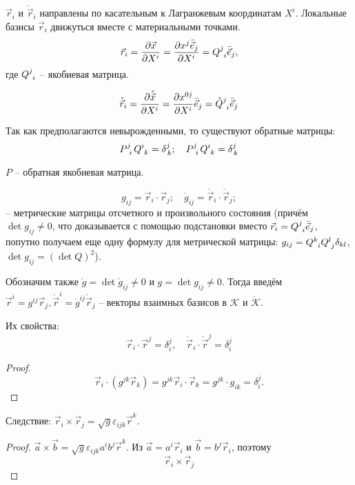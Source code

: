 $\vec{r}_i$ и $\mathring{\vec{r}}_i$ направлены по касательным к Лагранжевым координатам $X^i$. 
Локальные базисы $\vec{r}_i$ движуться вместе с материальными точками. 
\[
  \vec{r}_i
  = \dfrac{\partial \vec{x}}{\partial X^i}
  = \dfrac{\partial x^j \bar{\vec{e}}_j}{\partial X^i}  
  = \tensor{Q}{^j_i} \bar{\vec{e}}_j,
\]
где $\tensor{Q}{^j_i}$ -- якобиевая матрица.

\[
  \mathring{\vec{r}}_i = \dfrac{\partial \mathring{\vec{x}}}{\partial X^i}
  = \dfrac{\partial x^{0j}}{\partial X^i} \bar{\vec{e}}_j
  = \tensor{\mathring{Q}}{^j_i} \bar{\vec{e}}_j
\]

Так как предполагаются невырожденными, то существуют обратные матрицы:
\[
  \tensor{P}{^j_i} \tensor{Q}{^i_k} = \delta^j_{\, k}; \quad
  \tensor{P}{^j_i} \tensor{Q}{^i_k} = \delta^j_{\, k} %
\]

$P$ -- обратная якобиевая матрица.

\[
  g_{ij} = \vec{r}_i \cdot \vec{r}_j; 
  \quad
  \mathring{g}_{ij} = \mathring{\vec{r}}_i \cdot \mathring{\vec{r}}_j;
\]
-- метрические матрицы отсчетного и произвольного состояния (причём $\det g_{ij} \neq 0$, что
доказывается с помощью подстановки вместо $\vec{r}_i = \tensor{Q}{^j_i} \bar{\vec{e}}_j$, попутно
получаем еще одну формулу для метрической матрицы: 
$g_{ij} = \tensor{Q}{^k_i} \tensor{Q}{^l_j} \delta_{kl}$, $\det g_{ij} = (\det Q )^2$).

Обозначим также $\mathring{g} = \det \mathring{g}_{ij} \neq 0$ и $g = \det g_{ij} \neq 0$.
Тогда введём $\vec{r}^i  = g^{ij} \vec{r}_j, \mathring{\vec{r}}^i = \mathring{g}^{ij}
\mathring{\vec{r}}_j$ --
векторы взаимных базисов в $\mathcal{K}$ и $\mathring{\mathcal{K}}$.

Их свойства:
\[
  \vec{r}_i \cdot \vec{r}^j = \delta^j_i, \quad \mathring{\vec{r}}_i \cdot \mathring{\vec{r}}^j = \delta^j_i
\]
\begin{proof}
  \[
    \vec{r}_i \cdot (g^{jk} \vec{r}_k)
    = g^{jk} \vec{r}_i \cdot \vec{r}_k
    = g^{jk} \cdot g_{ik} = \delta_i^j.
  \]
\end{proof}

Следствие: $\vec{r}_i \times \vec{r}_j = \sqrt{g} \varepsilon_{ijk} \vec{r}^k$.

\begin{proof}
  $\vec{a} \times \vec{b} = \sqrt{g} \varepsilon_{ijk} a^i b^j \vec{r}^k$.
  Из $\vec{a} = a^i \vec{r}_i$ и $\vec{b} = b^j \vec{r}_i$, поэтому 
  \[
    \vec{r}_i \times \vec{r}_j
  \]
\end{proof}


